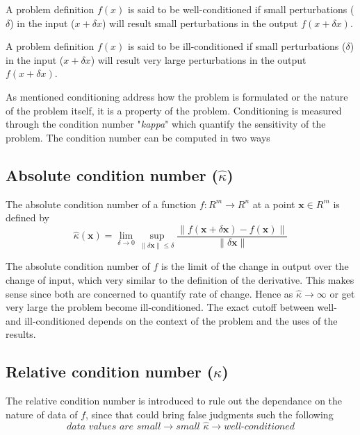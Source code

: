 \documentclass[../main.tex]{subfiles}
\begin{document}
	\begin{definition}
		A problem definition $f(x)$ is said to be well-conditioned if small perturbations ($\delta$) in the input ($x + \delta x$) will result small perturbations in the output $f(x + \delta x)$.
	\end{definition}
	
	\begin{definition}
		A problem definition $f(x)$ is said to be ill-conditioned if small perturbations ($\delta$) in the input ($x + \delta x$) will result very large perturbations in the output $f(x + \delta x)$.
	\end{definition}
	
	\par As mentioned conditioning address how the problem is formulated or the nature of the problem itself, it is a property of the problem. Conditioning is measured through the condition number "\textit{kappa}" which quantify the sensitivity of the problem. The condition number can be computed in two ways
	\subsection{Absolute condition number ($\hat{\kappa}$)}
		\par The absolute condition number of a function $f : R^m \rightarrow R^n$ at a point $\mathbf{x} \in R^m$ is defined by 
		\begin{equation*}					
			\hat{\kappa}(\mathbf{x}) = \lim_{\delta \rightarrow 0} \sup_{\| \delta \mathbf{x} \| \leq \delta}\frac{\| f(\mathbf{x} + \delta \mathbf{x}) - f(\mathbf{x}) \|}{\| \delta \mathbf{x} \|}
		\end{equation*}
		
		\par The absolute condition number of $f$ is the limit of the change in output over the change of input, which very similar to the definition of the derivative. This makes sense since both are concerned to quantify rate of change. Hence as $\hat{\kappa} \rightarrow \infty$ or get very large the problem become ill-conditioned. The exact cutoff between well- and ill-conditioned depends on the context of the problem and the uses of the results.
	
	\subsection{Relative condition number ($\kappa$)}
		\par The relative condition number is introduced to rule out the dependance on the nature of data of $f$, since that could bring false judgments such the following 
		\begin{equation*}
			\textit{data values are small} \rightarrow \textit{small $\hat{\kappa}$} \rightarrow \textit{well-conditioned}
		\end{equation*}
		
\end{document}
